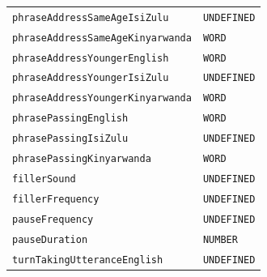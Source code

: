 \documentclass{CSSRforAfrica}
\begin{document}
\begin{table}[H]
\begin{tabular}{l l}
{\footnotesize \verb+phraseAddressSameAgeIsiZulu+}                       & {\footnotesize \verb+UNDEFINED+} \vspace{-1.5mm}  \\
{\footnotesize \verb+phraseAddressSameAgeKinyarwanda+}             & {\footnotesize \verb+WORD+} \vspace{-1.5mm}  \\
{\footnotesize \verb+phraseAddressYoungerEnglish+}                       & {\footnotesize \verb+WORD+} \vspace{-1.5mm} \\
{\footnotesize \verb+phraseAddressYoungerIsiZulu+}                       & {\footnotesize \verb+UNDEFINED+} \vspace{-1.5mm} \\
{\footnotesize \verb+phraseAddressYoungerKinyarwanda+}              & {\footnotesize \verb+WORD+} \vspace{-1.5mm} \\
{\footnotesize \verb+phrasePassingEnglish+}                                    & {\footnotesize \verb+WORD+} \vspace{-1.5mm} \\
{\footnotesize \verb+phrasePassingIsiZulu+}                                    & {\footnotesize \verb+UNDEFINED+} \vspace{-1.5mm} \\
{\footnotesize \verb+phrasePassingKinyarwanda+}                           & {\footnotesize \verb+WORD+} \vspace{-1.5mm} \\
{\footnotesize \verb+fillerSound+}                                                   & {\footnotesize \verb+UNDEFINED+ } \vspace{-1.5mm} \\
{\footnotesize \verb+fillerFrequency+}                                             & {\footnotesize \verb+UNDEFINED+ } \vspace{-1.5mm} \\
{\footnotesize \verb+pauseFrequency+}                                            & {\footnotesize \verb+UNDEFINED+ } \vspace{-1.5mm} \\
{\footnotesize \verb+pauseDuration+} 	                                            & {\footnotesize \verb+NUMBER+} \vspace{-1.5mm}   \\
{\footnotesize \verb+turnTakingUtteranceEnglish+}                          & {\footnotesize \verb+UNDEFINED+} \vspace{-1.5mm} \\

\end{tabular}
\end{table}
\end{document}
